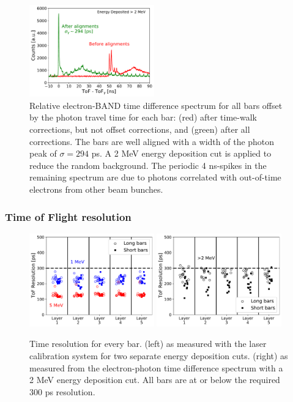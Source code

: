 \documentclass[3p,twocolumn]{elsarticle}
\begin{document}
\begin{figure}[th!]
	\centering
		\includegraphics[width=0.48\textwidth]{fig21-alignment.pdf}
                \caption{Relative electron-BAND time difference
                  spectrum for all bars offset by the photon travel
                  time for each bar: (red) after time-walk
                  corrections, but not offset corrections, and (green)
                  after all corrections. The bars are well
                  aligned with a width of the photon peak of
                  $\sigma=294$ \si{\pico\s}. A 2
                  \si{\mega\electronvolt} energy deposition cut is
                  applied to reduce the random background.  The
                  periodic 4 \si{\nano\s}-spikes in the remaining
                  spectrum are due to photons correlated with out-of-time
                  electrons from other beam bunches.}
	\label{fig:final_offset}
\end{figure}

\subsubsection{Time of Flight resolution}
\label{sec:tofresolution}
\begin{figure}[tb]
	\centering
			\includegraphics[width=0.48\textwidth]{fig22a-laserres.pdf}
		\includegraphics[width=0.48\textwidth]{fig22b-photonres.pdf}
	\caption{Time resolution for every bar. (left) as measured
          with the laser calibration system for two separate energy
          deposition cuts. (right) as measured
          from the electron-photon time difference spectrum with a
          2 \si{\mega\electronvolt} energy deposition cut. All bars
          are at or below the required 300 \si{\pico\s} resolution. }
	\label{fig:tof_resolution}
\end{figure}
\end{document}

